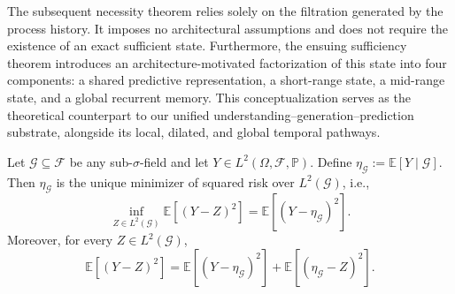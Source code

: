 \documentclass{llmxive}
\providecommand{\E}{\mathbb{E}}
\providecommand{\Prob}{\mathbb{P}}
\providecommand{\cF}{\mathcal{F}}
\begin{document}
\begin{remark}
\label{rem:scope_of_two_results}
The subsequent necessity theorem relies solely on the filtration generated by the process history. It imposes no architectural assumptions and does not require the existence of an exact sufficient state. Furthermore, the ensuing sufficiency theorem introduces an architecture-motivated factorization of this state into four components: a shared predictive representation, a short-range state, a mid-range state, and a global recurrent memory. This conceptualization serves as the theoretical counterpart to our unified understanding--generation--prediction substrate, alongside its local, dilated, and global temporal pathways.
\end{remark}















\begin{lemma}
\label{lem:l2_projection}
Let $\mathcal G \subseteq \cF$ be any sub-$\sigma$-field and let $Y\in L^2(\Omega,\cF,\Prob)$.
Define $\eta_{\mathcal G} := \E[Y\mid \mathcal G].$ Then $\eta_{\mathcal G}$ is the unique minimizer of squared risk over $L^2(\mathcal G)$, i.e.,
\begin{equation}
\inf_{Z \in L^2(\mathcal G)} \E[(Y-Z)^2]
=
\E[(Y-\eta_{\mathcal G})^2].
\label{eq:l2_projection_statement}
\end{equation}
Moreover, for every $Z\in L^2(\mathcal G)$,
\begin{equation}
\E[(Y-Z)^2]
=
\E[(Y-\eta_{\mathcal G})^2]
+
\E[(\eta_{\mathcal G}-Z)^2].
\label{eq:pythagorean_identity}
\end{equation}
\end{lemma}
\end{document}
